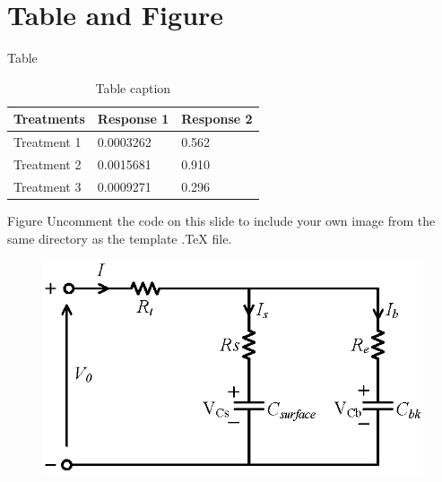 \documentclass{beamer}
\begin{document}
\section{Table and Figure}

\begin{frame}{Table}
\begin{table}
\begin{tabular}{l l l}
\toprule
\textbf{Treatments} & \textbf{Response 1} & \textbf{Response 2}\\
\midrule
Treatment 1 & 0.0003262 & 0.562 \\
Treatment 2 & 0.0015681 & 0.910 \\
Treatment 3 & 0.0009271 & 0.296 \\
\bottomrule
\end{tabular}
\caption{Table caption}
\end{table}
\end{frame}

\begin{frame}{Figure}
Uncomment the code on this slide to include your own image from the same directory as the template .TeX file.
\begin{figure}
\includegraphics[width=0.7\linewidth]{rcmodel}
\end{figure}
\end{frame}
\end{document}

